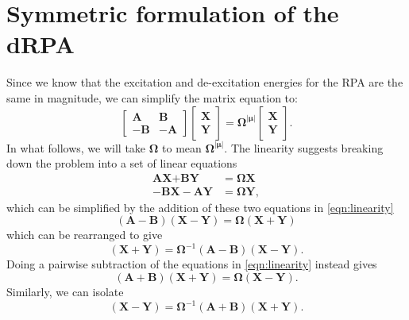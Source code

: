 \documentclass[12pt]{caltech_thesis}
\begin{document}
\appendix

\chapter{Symmetric formulation of the dRPA}
\label{app:symm_drpa}
Since we know that the excitation and de-excitation energies for the RPA are the same in magnitude, we can simplify the matrix equation to:
\begin{equation}
\begin{bmatrix}
\textbf{A} & \textbf{B} \\
-\textbf{B} & -\textbf{A}
\end{bmatrix}
\begin{bmatrix}
\textbf{X} \\
\textbf{Y}
\end{bmatrix}
= \boldsymbol{\Omega^{|\mu|} }
\begin{bmatrix}
\textbf{X} \\
\textbf{Y}
\end{bmatrix}
.
\end{equation}
In what follows, we will take $\boldsymbol{\Omega }$ to mean $\boldsymbol{\Omega^{|\mu|} }$.
The linearity suggests breaking down the problem into a set of linear equations
\begin{align}
    \textbf{AX} + \textbf{BY} &= \boldsymbol{\Omega } \textbf{X}\\
    -\textbf{BX}-\textbf{AY} &= \boldsymbol{\Omega } \textbf{Y},
\label{eqn:linearity}
\end{align}
which can be simplified by the addition of these two equations in \ref{eqn:linearity}
\begin{equation}
    (\textbf{A}-\textbf{B})(\textbf{X}-\textbf{Y})= \boldsymbol{\Omega } (\textbf{X}+\textbf{Y})
\label{eqn:for_addition}
\end{equation}
which can be rearranged to give
\begin{equation}
    (\textbf{X}+\textbf{Y}) = \boldsymbol{\Omega }^{-1}(\textbf{A}-\textbf{B})(\textbf{X}-\textbf{Y}).
\label{eqn:addition}
\end{equation}
Doing a pairwise subtraction of the equations in \ref{eqn:linearity} instead gives
\begin{equation}
    (\textbf{A}+\textbf{B})(\textbf{X}+\textbf{Y})= \boldsymbol{\Omega } (\textbf{X}-\textbf{Y}). 
\label{eqn:for_subtraction}
\end{equation}
Similarly, we can isolate
\begin{equation}
    (\textbf{X}-\textbf{Y}) = \boldsymbol{\Omega }^{-1}(\textbf{A}+\textbf{B})(\textbf{X}+\textbf{Y}).
\label{eqn:subtraction}
\end{equation}
\end{document}
